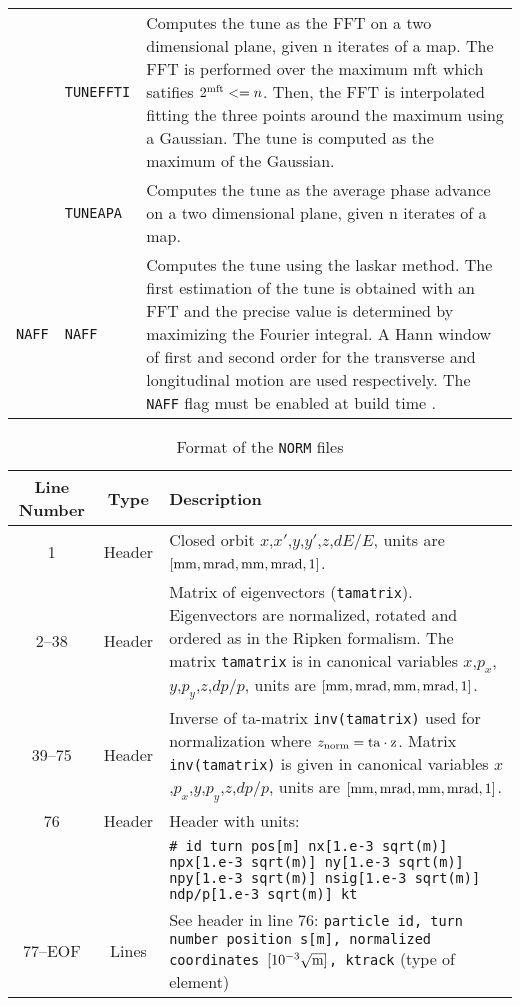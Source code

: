 \begin{table}[H]
\begin{center}
\begin{tabularx}{\textwidth}{|l|l|X|}
    \cline{2-3}
    & \texttt{TUNEFFTI} & Computes the tune as the FFT on a two dimensional plane, given n iterates of a map. The FFT is performed over the maximum mft which satifies $2^{\rm mft} <= n$. Then, the FFT is interpolated fitting the three points around the maximum using a Gaussian. The tune is computed as the maximum of the Gaussian.\\
    \cline{2-3}
    & \texttt{TUNEAPA} & Computes the tune as the average phase advance on a two dimensional plane, given n iterates of a map. \\
    \hline
    \texttt{NAFF} \cite{NAFFpaper, NAFFpaper2}
    & \texttt{NAFF} & Computes the tune using the laskar method. The first estimation of the tune is obtained with an FFT and the precise value is determined by maximizing the Fourier integral. A Hann window of first and second order for the transverse and longitudinal motion are used respectively. The \texttt{NAFF} flag must be enabled at build time \cite{sixbuild}. \\
    \hline
    \end{tabularx}
\end{center}
\end{table}

\begin{table}[H]
\begin{center}
    \caption{Format of the \texttt{NORM} files}\label{fma:tab:2}
    \begin{tabularx}{\textwidth}{|c|c|X|}
        \hline
        \rowcolor{blue!30}
        \textbf{Line Number} & \textbf{Type} & \textbf{Description} \\
        \hline
        1 & Header & Closed orbit  $x$,$x'$,$y$,$y'$,$z$,$dE/E$, units are $[\rm mm,mrad,mm,mrad,1]$. \\
        \hline
        2--38 & Header & Matrix of eigenvectors (\texttt{tamatrix}). Eigenvectors are normalized, rotated and ordered as in the Ripken formalism. The matrix \texttt{tamatrix} is in canonical variables $x$,$p_x$,$y$,$p_y$,$z$,$dp/p$, units are $[\rm mm,mrad,mm,mrad,1]$. \\
        \hline
        39--75 & Header & Inverse of ta-matrix \texttt{inv(tamatrix)} used for normalization where \hbox{$z_{\rm norm}=\rm{ta}\cdot z$}. Matrix \texttt{inv(tamatrix)} is given in canonical variables $x$,$p_x$,$y$,$p_y$,$z$,$dp/p$, units are $[\rm mm,mrad,mm,mrad,1]$.\\
        \hline
        76 & Header & Header with units:\\
        &  & \texttt{\# id turn pos[m] nx[1.e-3 sqrt(m)] npx[1.e-3 sqrt(m)] ny[1.e-3 sqrt(m)] npy[1.e-3 sqrt(m)] nsig[1.e-3 sqrt(m)] ndp/p[1.e-3 sqrt(m)] kt} \\
        \hline
        77--EOF & Lines & See header in line 76: \texttt{particle id, turn number position s[m], normalized coordinates $[10^{-3} \sqrt{\rm m}]$, ktrack} (type of element)\\
        \hline
    \end{tabularx}
\end{center}
\end{table}

